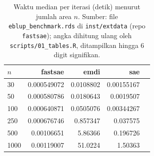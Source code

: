 \begin{table}[htbp]
\centering
\caption{Waktu median per iterasi (detik) menurut jumlah area $n$. Sumber: file \texttt{eblup\_benchmark.rds} di \texttt{inst/extdata} (repo \texttt{fastsae}); angka dihitung ulang oleh \texttt{scripts/01\_tables.R}, ditampilkan hingga 6 digit signifikan.}
\label{tab:time-fh}
\small
\begin{tabular}{lrrrr}
\toprule
$n$ & fastsae & emdi & sae \\
\midrule
30 & 0.000549072 & 0.0108802 & 0.00155167 \\
50 & 0.000580786 & 0.0180643 & 0.0019507 \\
100 & 0.000640871 & 0.0505076 & 0.00344267 \\
250 & 0.000676746 & 0.857347 & 0.037575 \\
500 & 0.00106651 & 5.86366 & 0.196726 \\
1000 & 0.00119007 & 51.0224 & 1.50363 \\
\bottomrule
\end{tabular}
\end{table}


